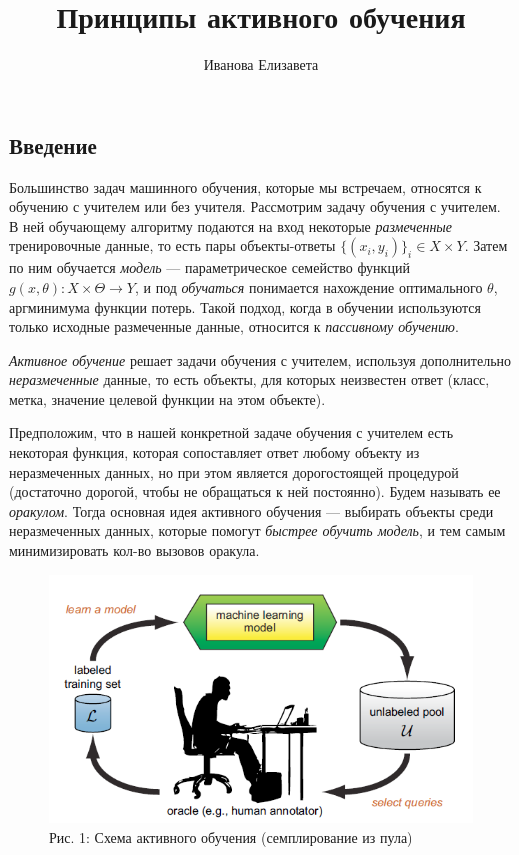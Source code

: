 \documentclass[]{article}
\title{Принципы активного обучения}
\author{Иванова Елизавета}
\date{}
\begin{document}
\maketitle

\subsection{Введение}\label{ux432ux432ux435ux434ux435ux43dux438ux435}

Большинство задач машинного обучения, которые мы встречаем, относятся к
обучению с учителем или без учителя. Рассмотрим задачу обучения с
учителем. В ней обучающему алгоритму подаются на вход некоторые
\emph{размеченные} тренировочные данные, то есть пары объекты-ответы
\(\{(x_i, y_i)\}_i \in X \times Y\). Затем по ним обучается
\emph{модель} --- параметрическое семейство функций
\(g(x, \theta): X \times \Theta \to Y\), и под \emph{обучаться}
понимается нахождение оптимального \(\theta\), аргминимума функции
потерь. Такой подход, когда в обучении используются только исходные
размеченные данные, относится к \emph{пассивному обучению}.

\emph{Активное обучение} решает задачи обучения с учителем, используя
дополнительно \emph{неразмеченные} данные, то есть объекты, для которых
неизвестен ответ (класс, метка, значение целевой функции на этом
объекте).

Предположим, что в нашей конкретной задаче обучения с учителем есть
некоторая функция, которая сопоставляет ответ любому объекту из
неразмеченных данных, но при этом является дорогостоящей процедурой
(достаточно дорогой, чтобы не обращаться к ней постоянно). Будем
называть ее \emph{оракулом}. Тогда основная идея активного обучения ---
выбирать объекты среди неразмеченных данных, которые помогут
\emph{быстрее обучить модель}, и тем самым минимизировать кол-во вызовов
оракула.

\begin{figure}[htbp]
\centering
\includegraphics[width=6.66667in]{img/al.png}
\caption{Рис. 1: Схема активного обучения (семплирование из пула)}
\end{figure}
\end{document}
